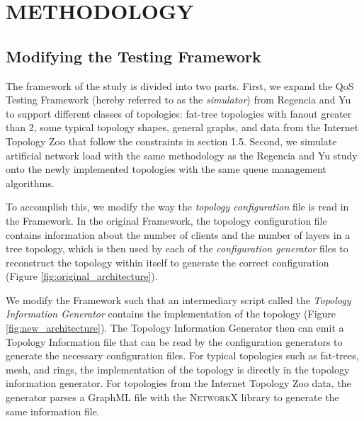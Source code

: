\chapter{METHODOLOGY}
\section{Modifying the Testing Framework}
The framework of the study is divided into two parts. First, we expand the QoS Testing Framework (hereby referred to as the \textit{simulator}) from Regencia and Yu to support different classes of topologies: fat-tree topologies with fanout greater than 2, some typical topology shapes, general graphs, and data from the Internet Topology Zoo that follow the constraints in section 1.5. Second, we simulate artificial network load with the same methodology as the Regencia and Yu study onto the newly implemented topologies with the same queue management algorithms. 

To accomplish this, we modify the way the \textit{topology configuration} file is read in the Framework. In the original Framework, the topology configuration file contains information about the number of clients and the number of layers in a tree topology, which is then used by each of the \textit{configuration generator} files to reconstruct the topology within itself to generate the correct configuration (Figure \ref{fig:original_architecture}). 

We modify the Framework such that an intermediary script called the \textit{Topology Information Generator} contains the implementation of the topology (Figure \ref{fig:new_architecture}). The Topology Information Generator then can emit a Topology Information file that can be read by the configuration generators to generate the necessary configuration files. For typical topologies such as fat-trees, mesh, and rings, the implementation of the topology is directly in the topology information generator. For topologies from the Internet Topology Zoo data, the generator parses a GraphML file with the  \textsc{NetworkX} library to generate the same information file.

